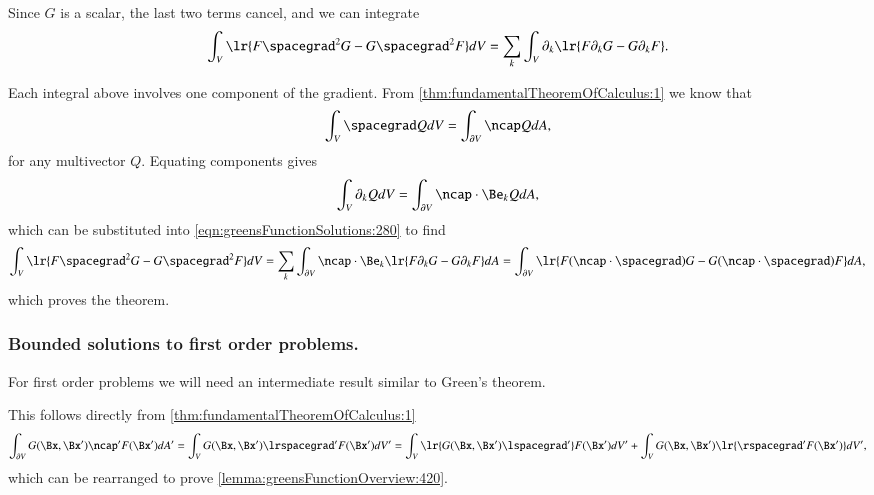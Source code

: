 Since \( G \) is a scalar, the last two terms cancel, and we can integrate
\begin{dmath}\label{eqn:greensFunctionSolutions:280}
\int_V \lr{ F \spacegrad^2 G - G \spacegrad^2 F } dV
=
\sum_k \int_V \partial_k \lr{ F \partial_k G - G \partial_k F }.
\end{dmath}

Each integral above involves one component of the gradient.
From
\cref{thm:fundamentalTheoremOfCalculus:1}
we know that
\begin{dmath}\label{eqn:greensFunctionSolutions:300}
\int_V \spacegrad Q dV = \int_{\partial V} \ncap Q dA,
\end{dmath}
for any multivector \( Q \).
Equating components gives
\begin{dmath}\label{eqn:greensFunctionSolutions:460}
\int_V \partial_k Q dV = \int_{\partial V} \ncap \cdot \Be_k Q dA,
\end{dmath}
which can be substituted into \cref{eqn:greensFunctionSolutions:280} to find
\begin{dmath}\label{eqn:greensFunctionSolutions:480}
\int_V \lr{ F \spacegrad^2 G - G \spacegrad^2 F } dV
=
\sum_k \int_{\partial V} \ncap \cdot \Be_k \lr{ F \partial_k G - G \partial_k F } dA
=
\int_{\partial V} \lr{ F (\ncap \cdot \spacegrad) G - G (\ncap \cdot \spacegrad) F } dA,
\end{dmath}
which proves the theorem.

\subsubsection{Bounded solutions to first order problems.}

For first order problems we will need an intermediate result similar to Green's theorem.


This follows directly from \cref{thm:fundamentalTheoremOfCalculus:1}
\begin{dmath}\label{eqn:greensFunctionSolutions:440}
\int_{\partial V} G(\Bx, \Bx') \ncap' F(\Bx') dA'
=
\int_V G(\Bx, \Bx') \lrspacegrad' F(\Bx') dV'
=
\int_V \lr{ G(\Bx, \Bx') \lspacegrad' } F(\Bx') dV'
+
\int_V G(\Bx, \Bx') \lr{ \rspacegrad' F(\Bx') } dV',
\end{dmath}
which can be rearranged to prove \cref{lemma:greensFunctionOverview:420}.

